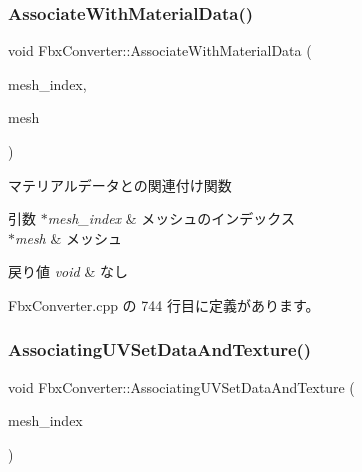 \subsubsection{\texorpdfstring{Associate\+With\+Material\+Data()}{AssociateWithMaterialData()}}
{\footnotesize\ttfamily void Fbx\+Converter\+::\+Associate\+With\+Material\+Data (\begin{DoxyParamCaption}\item[{int}]{mesh\+\_\+index,  }\item[{Fbx\+Mesh $\ast$}]{mesh }\end{DoxyParamCaption})\hspace{0.3cm}{\ttfamily [private]}}



マテリアルデータとの関連付け関数 


\begin{DoxyParams}{引数}
{\em $\ast$mesh\+\_\+index} & メッシュのインデックス \\
\hline
{\em $\ast$mesh} & メッシュ \\
\hline
\end{DoxyParams}

\begin{DoxyRetVals}{戻り値}
{\em void} & なし \\
\hline
\end{DoxyRetVals}


 Fbx\+Converter.\+cpp の 744 行目に定義があります。

\mbox{\label{class_fbx_converter_a0d669f32bb338dffeb5d1989a0b374d7}} 
\subsubsection{\texorpdfstring{Associating\+U\+V\+Set\+Data\+And\+Texture()}{AssociatingUVSetDataAndTexture()}}
{\footnotesize\ttfamily void Fbx\+Converter\+::\+Associating\+U\+V\+Set\+Data\+And\+Texture (\begin{DoxyParamCaption}\item[{int}]{mesh\+\_\+index }\end{DoxyParamCaption})\hspace{0.3cm}{\ttfamily [private]}}



